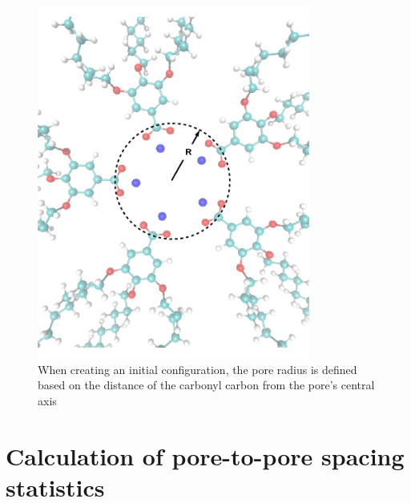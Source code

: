 \documentclass[journal=jpcbfk,manusciprt=article]{achemso}
\begin{document}
  \begin{figure}[!htb]
	\centering
	\includegraphics[width=0.8\textwidth]{pore_radius_illustration.png}
	\caption{When creating an initial configuration, the pore radius is defined based
	on the distance of the carbonyl carbon from the pore's central axis}
	\label{fig:pore_radius_illustration}
  \end{figure}

  \section{Calculation of pore-to-pore spacing statistics}\label{section:p2p_stats}
 
\end{document}
